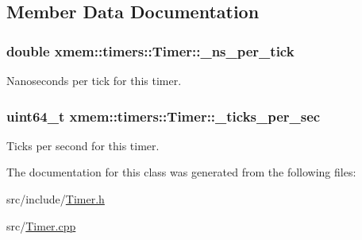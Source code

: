 \subsection{Member Data Documentation}
\hypertarget{classxmem_1_1timers_1_1_timer_a9c737c0df71e4cff93b6fd8dc20595ba}{
\subsubsection[{\-\_\-ns\-\_\-per\-\_\-tick}]{\setlength{\rightskip}{0pt plus 5cm}double xmem\-::timers\-::\-Timer\-::\-\_\-ns\-\_\-per\-\_\-tick\hspace{0.3cm}{\ttfamily [protected]}}}\label{classxmem_1_1timers_1_1_timer_a9c737c0df71e4cff93b6fd8dc20595ba}
Nanoseconds per tick for this timer. \hypertarget{classxmem_1_1timers_1_1_timer_ac038322b59bb4d8df046dedfe6844045}{
\subsubsection[{\-\_\-ticks\-\_\-per\-\_\-sec}]{\setlength{\rightskip}{0pt plus 5cm}uint64\-\_\-t xmem\-::timers\-::\-Timer\-::\-\_\-ticks\-\_\-per\-\_\-sec\hspace{0.3cm}{\ttfamily [protected]}}}\label{classxmem_1_1timers_1_1_timer_ac038322b59bb4d8df046dedfe6844045}
Ticks per second for this timer. 

The documentation for this class was generated from the following files\-:\begin{DoxyCompactItemize}
\item 
src/include/\hyperlink{_timer_8h}{Timer.\-h}\item 
src/\hyperlink{_timer_8cpp}{Timer.\-cpp}\end{DoxyCompactItemize}

